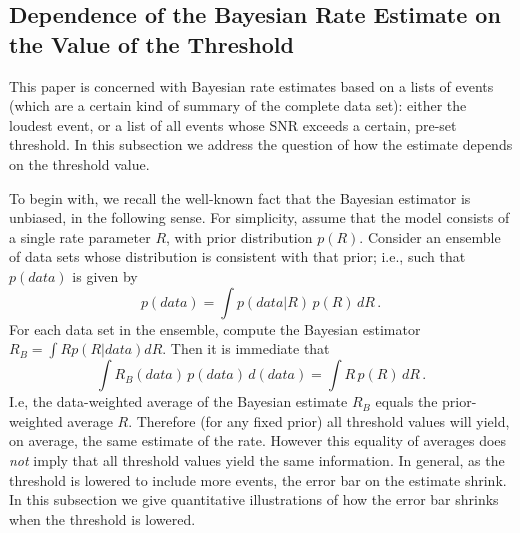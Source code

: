\documentclass[aps,prd]{revtex4-1}
\newcommand{\curt}[1]{{\color{magenta} \bf #1}}
\newcommand{\be}{\begin{equation}}
\newcommand{\ee}{\end{equation}}
\begin{document}
\subsection{Dependence of the Bayesian Rate Estimate on the Value of the Threshold}
This paper is concerned with Bayesian rate estimates based on a  lists of events (which are a certain kind of summary of the complete data set): either the loudest event, or a list of all events whose SNR exceeds a certain, pre-set threshold.  In this subsection we address the question of how the estimate depends on the threshold value.  

To begin with, we recall the well-known fact that the Bayesian estimator is
unbiased, in the following sense.  For simplicity, assume that the model consists of a single
rate parameter $R$, with prior distribution $p(R)$.  Consider an ensemble of data sets 
whose distribution is consistent with that prior; i.e., such that $p(data)$ is given by
\be
p(data) = \int{ p(data|R)\,p(R)\, dR}\, .
\ee
For each data set in the ensemble, compute the Bayesian estimator $R_{B} = \int{ R p(R|data) dR}$.
Then it is immediate that 
\be 
\int{R_{B}(data)\, p(data)\,d(data) }= \int{ R\, p(R) \,dR}\, .
\ee
\noindent I.e, the data-weighted average of the Bayesian estimate $R_{B}$ equals the prior-weighted average $R$. 
%
Therefore (for any fixed prior) all threshold values will yield, on average, the same estimate of the rate.  However this equality of averages does {\it not} imply that all threshold values yield the same information. In general, as the threshold is lowered to include more events, the error bar on the estimate shrink.  In this subsection we give quantitative illustrations of how the error bar shrinks when the threshold is lowered.    
\end{document}
